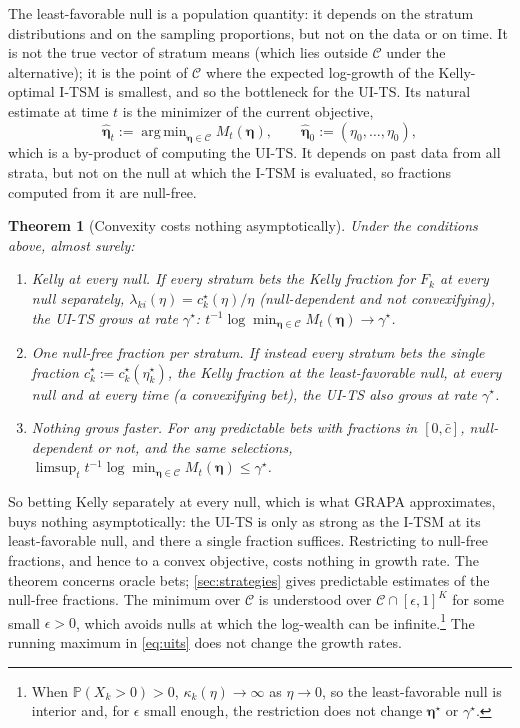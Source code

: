 \documentclass[11pt]{article}
\newcommand{\bs}{\boldsymbol}
\renewcommand{\Pr}{\mathbb{P}}
\newcommand{\calC}{\mathcal{C}}
\newcommand{\cbar}{\bar c}
\DeclareMathOperator*{\argmin}{arg\,min}
\theoremstyle{plain}
\newtheorem{theorem}{Theorem}
\theoremstyle{definition}
\theoremstyle{remark}
\begin{document}
The least-favorable null is a population quantity: it depends on the stratum distributions and on the sampling
proportions, but not on the data or on time.  It is not the true vector of stratum means (which lies outside
$\calC$ under the alternative); it is the point of $\calC$ where the expected log-growth of the Kelly-optimal I-TSM is
smallest, and so the bottleneck for the UI-TS.  Its natural estimate at time $t$ is the minimizer of the current
objective,
\begin{equation}\label{eq:ref}
\hat{\bs\eta}_t := \argmin_{\bs\eta\in\calC} M_t(\bs\eta), \qquad \hat{\bs\eta}_0 := (\eta_0,\ldots,\eta_0),
\end{equation}
which is a by-product of computing the UI-TS.  It depends on past data from all strata, but not on the null at which
the I-TSM is evaluated, so fractions computed from it are null-free.

\begin{theorem}[Convexity costs nothing asymptotically]\label{thm:nocost}
Under the conditions above, almost surely:
\begin{enumerate}
  \item[(i)] \emph{Kelly at every null.}  If every stratum bets the Kelly fraction for $F_k$ at every null separately,
  $\lambda_{ki}(\eta)=c^\star_k(\eta)/\eta$ (null-dependent and not convexifying), the UI-TS grows at rate $\gamma^\star$:
  $t^{-1}\log\min_{\bs\eta\in\calC}M_t(\bs\eta)\to\gamma^\star$.
  \item[(ii)] \emph{One null-free fraction per stratum.}  If instead every stratum bets the single fraction
  $c^\star_k:=c^\star_k(\eta^\star_k)$, the Kelly fraction at the least-favorable null, at every null and at every
  time (a convexifying bet), the UI-TS also grows at rate $\gamma^\star$.
  \item[(iii)] \emph{Nothing grows faster.}  For any predictable bets with fractions in $[0,\cbar]$, null-dependent or
  not, and the same selections, $\limsup_{t}t^{-1}\log\min_{\bs\eta\in\calC}M_t(\bs\eta)\le\gamma^\star$.
\end{enumerate}
\end{theorem}

So betting Kelly separately at every null, which is what GRAPA approximates, buys nothing asymptotically: the UI-TS
is only as strong as the I-TSM at its least-favorable null, and there a single fraction suffices.  Restricting to
null-free fractions, and hence to a convex objective, costs nothing in growth rate.  The theorem concerns oracle bets;
\cref{sec:strategies} gives predictable estimates of the null-free fractions.  The minimum over $\calC$ is understood
over $\calC\cap[\epsilon,1]^K$ for some small $\epsilon>0$, which avoids nulls at which the log-wealth can be
infinite.\footnote{When $\Pr(X_k>0)>0$, $\kappa_k(\eta)\to\infty$ as $\eta\to0$, so the least-favorable null is interior
and, for $\epsilon$ small enough, the restriction does not change $\bs\eta^\star$ or $\gamma^\star$.}  The running maximum
in \eqref{eq:uits} does not change the growth rates.
\end{document}
